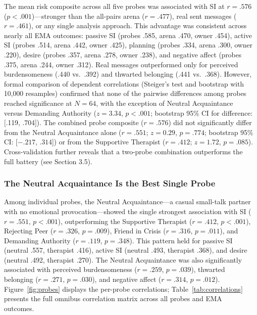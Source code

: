 \documentclass[review,12pt,authoryear]{elsarticle}
\begin{document}
The mean risk composite across all five probes was associated with SI at $r = .576$ ($p < .001$)---stronger than the all-pairs arena ($r = .477$), real sent messages ($r = .461$), or any single analysis approach. This advantage was consistent across nearly all EMA outcomes: passive SI (probes .585, arena .470, owner .454), active SI (probes .514, arena .442, owner .425), planning (probes .334, arena .300, owner .220), desire (probes .357, arena .278, owner .238), and negative affect (probes .375, arena .244, owner .312). Real messages outperformed only for perceived burdensomeness (.440 vs.\ .392) and thwarted belonging (.441 vs.\ .368). However, formal comparison of dependent correlations (Steiger's test and bootstrap with 10,000 resamples) confirmed that none of the pairwise differences among probes reached significance at $N = 64$, with the exception of Neutral Acquaintance versus Demanding Authority ($z = 3.34$, $p < .001$; bootstrap 95\% CI for difference: [.119, .704]). The combined probe composite ($r = .576$) did not significantly differ from the Neutral Acquaintance alone ($r = .551$; $z = 0.29$, $p = .774$; bootstrap 95\% CI: [$-.217$, $.314$]) or from the Supportive Therapist ($r = .412$; $z = 1.72$, $p = .085$). Cross-validation further reveals that a two-probe combination outperforms the full battery (see Section 3.5).

\subsubsection{The Neutral Acquaintance Is the Best Single Probe}

Among individual probes, the Neutral Acquaintance---a casual small-talk partner with no emotional provocation---showed the single strongest association with SI ($r = .551$, $p < .001$), outperforming the Supportive Therapist ($r = .412$, $p < .001$), Rejecting Peer ($r = .326$, $p = .009$), Friend in Crisis ($r = .316$, $p = .011$), and Demanding Authority ($r = .119$, $p = .348$). This pattern held for passive SI (neutral .557, therapist .416), active SI (neutral .493, therapist .368), and desire (neutral .492, therapist .270). The Neutral Acquaintance was also significantly associated with perceived burdensomeness ($r = .259$, $p = .039$), thwarted belonging ($r = .271$, $p = .030$), and negative affect ($r = .314$, $p = .012$). Figure~\ref{fig:probes} displays the per-probe correlations; Table~\ref{tab:correlations} presents the full omnibus correlation matrix across all probes and EMA outcomes.
\end{document}
